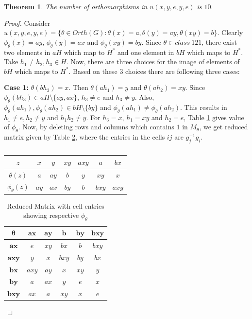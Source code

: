 \documentclass[11pt,a4paper]{article}
\newtheorem{theorem}{Theorem}[section]
\theoremstyle{definition}
\theoremstyle{remark}
\begin{document}
\begin{theorem}\label{th4}
     The number of orthomorphisms in $u(x,y,e,y,e)$ is $10.$
\end{theorem}
\begin{proof}
	 Consider $u(x,y,e,y,e) = \{ \theta \in Orth(G) : \theta(x) = a,\theta(y) = ay, \theta(xy) = b\}$. Clearly $\phi_{\theta}(x) =ay$, $\phi_{\theta}(y) = ax$ and $\phi_{\theta}(xy) = by$. Since $\theta \in class~121$, there exist two elements in $aH$ which map to  $H^{\ast}$ and one element in $bH$ which maps to $H^{\ast}$.  Take $h_{1} \neq h_{2}, h_{3} \in H$.  Now, there are three choices for the image of elements of $bH$ which maps to $H^{\ast}$. Based on these $3$ choices there are following three cases:   
	
	\textbf{Case 1:}  $\theta(bh_{3}) = x$. Then $\theta(ah_{1}) = y$ and $\theta(ah_{2}) = xy$. Since $\phi_{\theta}(bh_{3}) \in aH \setminus \{ay,ax\}$, $h_{3} \neq e$ and $h_{3} \neq y$. Also, $\phi_{\theta}(ah_{1}), \phi_{\theta}(ah_{2}) \in bH \setminus \{by\}$ and $\phi_{\theta}(ah_{1}) \neq \phi_{\theta}(ah_{2})$. This results in $h_{1} \neq e, h_{2} \neq y$ and $h_{1}h_{2} \neq y$. For $h_{3} = x$, $h_{1} = xy$ and $h_{2} = e$, Table \ref{t21} gives value of $\phi_{\theta}.$ Now, by deleting rows and columns which contains $1$ in $M_{\theta}$, we get reduced matrix given by Table \ref{t20}, where the entries in the cells $ij$ are $g_{j}^{-1}g_{i}$. 
	\begin{table}[H]
		\begin{center}
			\begin{tabular}{|c|c|c|c|c|c|c|}
				\hline
				$z$&$x$&$y$&$xy$&$axy$&$a$&$bx$ \\ \hline
			$\theta(z)$&$a$&$ay$&$b$&$y$&$xy$&$x$ \\ \hline
			$\phi_{\theta}(z)$&$ay$&$ax$&$by$&$b$&$bxy$&$axy$ \\ \hline
			\end{tabular}\caption{} \label{t21}
		\end{center}
	\end{table}
	\vspace{-.5cm}
		\begin{table}[H]
		\begin{center}
		\begin{tabular}{|c|c|c||c|c|c|}
			\hline
			 $\bm{\theta}$&$\bm{ax}$&$\bm{ay}$&$\bm{b}$&$\bm{by}$&$\bm{bxy}$\\ \hline
			 $\bm{ax}$&$e$&$xy$&\cellcolor{gray!25}$bx$&$b$&$bxy$\\ \hline
			 $\bm{axy}$&\cellcolor{gray!25}$y$&$x$&$bxy$&$by$&$bx$ \\ \hline \hline
			 $\bm{bx}$&$axy$&$ay$&$x$&\cellcolor{gray!25}$xy$&$y$ \\ \hline
			 $\bm{by}$&$a$&$ax$&$y$&$e$&\cellcolor{gray!25}$x$ \\ \hline
			 $\bm{bxy}$&$ax$&\cellcolor{gray!25}$a$&$xy$&$x$&$e$ \\ \hline 
		\end{tabular}\caption{Reduced Matrix with cell entries showing respective $\phi_{\theta}$} \label{t20}
		\end{center}
	\end{table}\vspace{-.7cm}


\end{proof}
\end{document}
